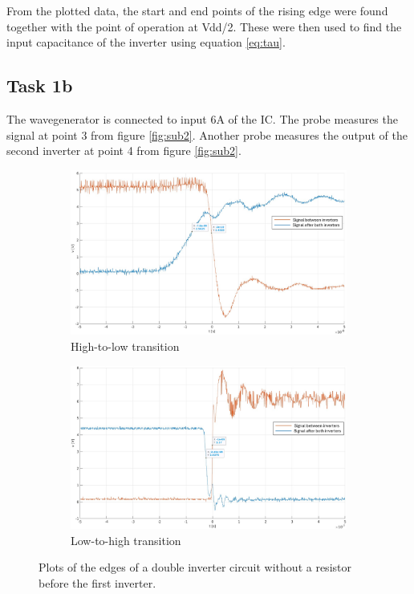 \documentclass[onecolumn]{article}
\begin{document}
From the plotted data, the start and end points of the rising edge were found together with the point of operation at Vdd/2. These were then used to find the input capacitance of the inverter using equation \ref{eq:tau}.

\subsection{Task 1b}
The wavegenerator is connected to input 6A of the IC. The probe measures the signal at point 3 from figure \ref{fig:sub2}. Another probe measures the output of the second inverter at point 4 from figure \ref{fig:sub2}. 

\begin{figure}[h!]
  \centering
  \begin{subfigure}{.5\textwidth}
    \centering
    \includegraphics[width=.8\linewidth]{task2bhl2.png}
    \caption{High-to-low transition}
    \label{fig:sub3}
  \end{subfigure}%
  \begin{subfigure}{.5\textwidth}
    \centering
    \includegraphics[width=.8\linewidth]{task2blh2.png}
    \caption{Low-to-high transition}
    \label{fig:sub4}
  \end{subfigure}
  \caption{Plots of the edges of a double inverter circuit without a resistor before the first inverter.}
  \label{fig:2}
\end{figure}
\end{document}
